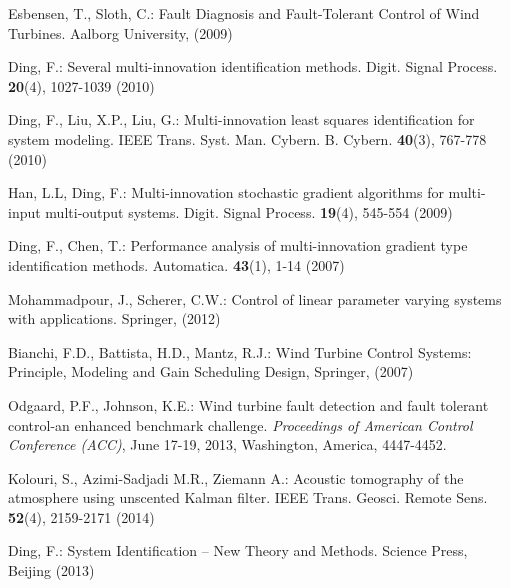 \begin{thebibliography}{99}
Esbensen, T., Sloth, C.: Fault Diagnosis and Fault-Tolerant Control of Wind Turbines. Aalborg University, (2009)

Ding, F.: Several multi-innovation identification methods. Digit. Signal Process. \textbf{20}(4), 1027-1039 (2010)

Ding, F., Liu, X.P., Liu, G.: Multi-innovation least squares identification for system modeling. IEEE Trans. Syst. Man. Cybern. B. Cybern. \textbf{40}(3), 767-778 (2010)

Han, L.L, Ding, F.: Multi-innovation stochastic gradient algorithms for multi-input multi-output systems. Digit. Signal Process. \textbf{19}(4), 545-554 (2009)

Ding, F., Chen, T.: Performance analysis of multi-innovation gradient type identification methods. Automatica. \textbf{43}(1), 1-14 (2007)

Mohammadpour, J., Scherer, C.W.: Control of linear parameter varying systems with applications. Springer, (2012)

Bianchi, F.D., Battista, H.D., Mantz, R.J.: Wind Turbine Control Systems: Principle, Modeling and Gain Scheduling Design, Springer, (2007)



Odgaard, P.F., Johnson, K.E.: Wind turbine fault detection and fault tolerant control-an enhanced benchmark challenge. \emph{Proceedings of American Control Conference (ACC)}, June 17-19, 2013, Washington, America, 4447-4452.

Kolouri, S., Azimi-Sadjadi M.R., Ziemann A.: Acoustic tomography of the atmosphere using unscented Kalman filter. IEEE Trans. Geosci. Remote Sens. \textbf{52}(4), 2159-2171  (2014)

Ding, F.: System Identification -- New Theory and Methods. Science Press, Beijing (2013)


\end{thebibliography}



